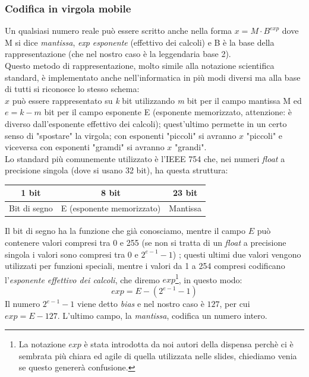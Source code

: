 \documentclass[class=book, crop=false, oneside]{standalone}
\begin{document}
\subsubsection{Codifica in virgola mobile}
Un qualsiasi numero reale può essere scritto anche nella forma $x=M\cdot B^{exp}$ dove M si dice \emph{mantissa}, \emph{exp} \emph{esponente} (effettivo dei calcoli) e B è la base della rappresentazione (che nel nostro caso è la leggendaria base 2).\\
Questo metodo di rappresentazione, molto simile alla notazione scientifica standard, è implementato anche nell'informatica in più modi diversi ma alla base di tutti si riconosce lo stesso schema: \\
$x$ può essere rappresentato su \emph{k} bit utilizzando \emph{m} bit per il campo mantissa M ed $e=k-m$ bit per il campo esponente E (esponente memorizzato, attenzione: è diverso dall'esponente effettivo dei calcoli); quest'ultimo permette in un certo senso di "spostare" la virgola; con esponenti "piccoli" si avranno $x$ "piccoli" e viceversa con esponenti "gramdi" si avranno $x$ "grandi".\\
Lo standard più comunemente utilizzato è l'IEEE 754 che, nei numeri \emph{float} a precisione singola (dove si usano 32 bit), ha questa struttura:
\begin{table}[h!]
	\centering
	\begin{tabular}{|l|l|l|}
		\hline
		\multicolumn{1}{|c|}{1 bit} & \multicolumn{1}{c|}{8 bit} & \multicolumn{1}{c|}{23 bit} \\ \hline
		Bit di segno                & E (esponente memorizzato)    & Mantissa                    \\ \hline
	\end{tabular}
\end{table}


Il bit di segno ha la funzione che già conosciamo, mentre il campo $E$ può contenere valori compresi tra 0 e 255 (se non si tratta di un \emph{float} a precisione singola i valori sono compresi tra 0 e \(2^{e-1}-1\))%
; questi ultimi due valori vengono utilizzati per funzioni speciali, mentre i valori da 1 a 254 compresi codificano l'\emph{esponente effettivo dei calcoli}, che diremo $exp$\footnote{La notazione $exp$ è stata introdotta da noi autori della dispensa perchè ci è sembrata più chiara ed agile di quella utilizzata nelle slides, chiediamo venia se questo genererà confusione.}, in questo modo:
\begin{equation*}
exp=E-(2^{e-1}-1)
\end{equation*}
Il numero $2^{e-1}-1$ viene detto \emph{bias} e nel nostro caso è \(127\), per cui $exp=E-127$. L'ultimo campo, la \emph{mantissa}, codifica un numero intero.
\end{document}
